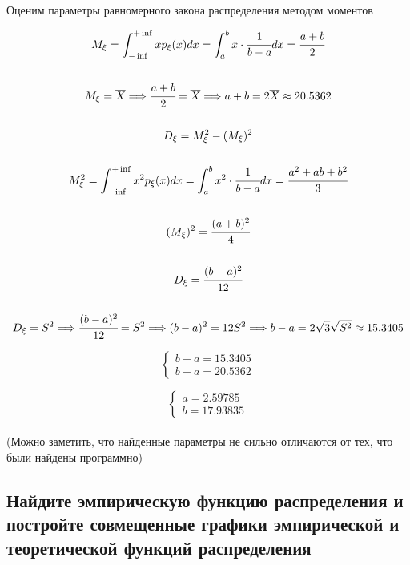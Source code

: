 \documentclass[a4paper, 14pt]{extarticle}
\begin{document}
Оценим параметры равномерного закона распределения методом моментов

\begin{gather*}
    M_{\xi} = \int_{-\inf}^{+\inf} x p_{\xi} (x) dx = 
    \int_{a}^{b} x \cdot \cfrac{1}{b-a} dx = \cfrac{a + b}{2} \\\\
    M_{\xi} = \overline{X} \Longrightarrow \cfrac{a + b}{2} = \overline{X} 
    \Longrightarrow a + b = 2 \overline{X} \approx 20.5362 \\\\
    D_{\xi} = M_{\xi}^2 - (M_{\xi})^2 \\\\
    M_{\xi}^2 = \int_{-\inf}^{+\inf} x^2 p_{\xi} (x) dx = 
    \int_{a}^{b} x^2 \cdot \cfrac{1}{b-a} dx = \cfrac{a^2 + ab + b^2}{3} \\\\
    (M_{\xi})^2 = \cfrac{(a + b)^2}{4} \\\\
    D_{\xi} = \cfrac{(b - a)^2}{12} \\\\
    D_{\xi} = S^2 \Longrightarrow \cfrac{(b - a)^2}{12} = S^2 
    \Longrightarrow (b - a)^2 = 12 S^2 \Longrightarrow b - a = 2 \sqrt{3} \sqrt{S^2}
    \approx 15.3405
\end{gather*}

\begin{equation*}
    \begin{cases}
        b - a = 15.3405 \\
        b + a = 20.5362
    \end{cases} 
\end{equation*}

\begin{equation*}
    \begin{cases}
        a = 2.59785 \\
        b = 17.93835
    \end{cases} 
\end{equation*}\\

(Можно заметить, что найденные параметры не сильно отличаются от тех, что были
найдены программно)

\subsection{Найдите эмпирическую функцию распределения и постройте 
совмещенные графики эмпирической и теоретической функций распределения}
\end{document}

